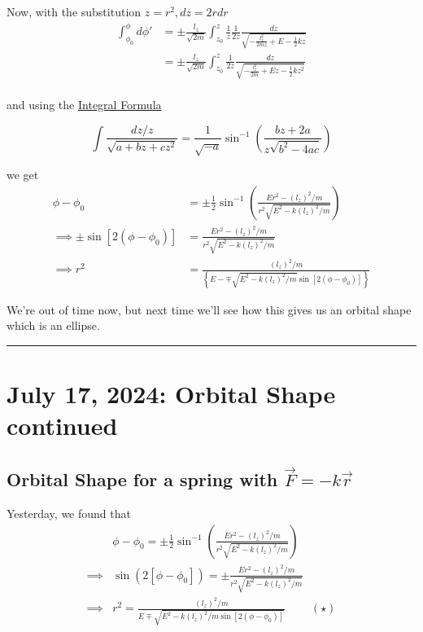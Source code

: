 \documentclass[11pt]{article}
\begin{document}
Now, with the substitution $z = r^2, dz = 2r dr$ 
\begin{align*}
  \int_{\phi_{0}}^{\phi} d\phi' &= \pm \frac{l_z}{\sqrt{2m}} \int_{z_0}^{z} \frac{1}{z} \frac{1}{2z} \frac{dz}{\sqrt{-\frac{l_z^2}{2mz} + E - \frac{1}{2}kz }} \\
  &= \pm \frac{l_z}{\sqrt{2m}} \int_{z_0}^{z} \frac{1}{2z} \frac{dz}{\sqrt{-\frac{l_z^2}{2m} + Ez - \frac{1}{2}kz^2 }} \\
\end{align*}

and using the \underline{Integral Formula}

\[ \int \frac{dz/z}{\sqrt{a + bz + cz^2}} = \frac{1}{\sqrt{-a}} \sin^{-1} \left( \frac{bz + 2a}{z \sqrt{b^2 - 4ac}} \right) \]

we get
\begin{align*}
  \phi - \phi_0 &= \pm \frac{1}{2} \sin^{-1} \left( \frac{Er^2 - (l_z)^2 / m}{r^2 \sqrt{E^2 - k(l_z)^2 / m}} \right) \\
  \implies \pm \sin\left[ 2(\phi - \phi_0) \right] &= \frac{Er^2 - (l_z)^2/m}{r^2 \sqrt{E^2 - k(l_z)^2/m}} \\
  \implies r^2 &= \frac{(l_z)^2 / m}{\left\{ E - \mp \sqrt{E^2 - k(l_z)^2/m} \sin \left[2(\phi - \phi_0)\right] \right\} }
\end{align*}

We're out of time now, but next  time we'll see how this gives us an orbital shape which is an ellipse.
\hrule

\pagebreak
\section{July 17, 2024: Orbital Shape continued}

\subsection{Orbital Shape for a spring with $\vec{F} = -k\vec{r}$}

Yesterday, we found that 
\begin{align*}
  &\phi - \phi_0 = \pm \frac{1}{2} \sin^{-1}\left(\frac{Er^2 - (l_z)^2/m}{r^2 \sqrt{E^2 - k(l_z)^2/m}}\right) \\
  \implies& \sin(2[\phi - \phi_0]) = \pm  \frac{Er^2 - (l_z)^2/m}{r^2 \sqrt{E^2 - k(l_z)^2/m}} \\
  \implies&\boxed{ r^2 = \frac{(l_z)^2/m}{E \mp \sqrt{E^2 - k(l_z)^2/m \sin\left[2(\phi - \phi_0)\right] }}} \;\;\;\;\;\;\;\;(\star)
\end{align*}
\end{document}
